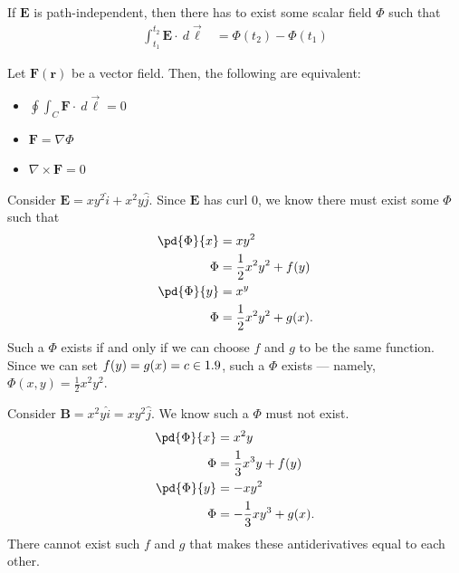 \documentclass[10pt]{mypackage}
\begin{document}
If $\mathbf{E}$ is path-independent, then there has to exist some scalar field $\Phi$ such that
\begin{align*}
  \int_{t_1}^{t_2} \mathbf{E}\cdot\:d\vec{\ell} &= \Phi\left(t_2\right)- \Phi\left(t_1\right)
\end{align*}
\begin{definition}
Let $\mathbf{F}\left(\mathbf{r}\right)$ be a vector field. Then, the following are equivalent:
\begin{itemize}
  \item $\displaystyle \oint\int_{C}^{} \mathbf{F}\cdot\:d\vec{\ell} = 0$
  \item $\mathbf{F} = \nabla \Phi$
  \item $\nabla \times \mathbf{F}=0$
\end{itemize}
\end{definition}
\begin{example}
  Consider $\mathbf{E} = xy^2\hat{i} + x^2y\hat{j}$. Since $\mathbf{E}$ has curl $0$, we know there must exist some $\Phi$ such that
  \begin{align*}
    \pd{\Phi}{x} &= xy^2\\
    \Phi &= \frac{1}{2}x^2y^2 + f(y)\\
    \pd{\Phi}{y} &= x^y\\
    \Phi &= \frac{1}{2}x^2y^2 + g(x).
  \end{align*}
  Such a $\Phi$ exists if and only if we can choose $f$ and $g$ to be the same function. Since we can set $f(y) = g(x) = c\in 1.9$, such a $\Phi$ exists --- namely, $\Phi(x,y) = \frac{1}{2}x^2y^2$.\newline

  Consider $\mathbf{B} = x^2y\hat{i} = xy^2\hat{j}$. We know such a $\Phi$ must not exist.
  \begin{align*}
    \pd{\Phi}{x} &= x^2y\\
    \Phi &= \frac{1}{3}x^3y + f(y)\\
    \pd{\Phi}{y} &= -xy^2\\
    \Phi &= -\frac{1}{3}xy^3 + g(x).
  \end{align*}
  There cannot exist such $f$ and $g$ that makes these antiderivatives equal to each other.
\end{example}
\end{document}
